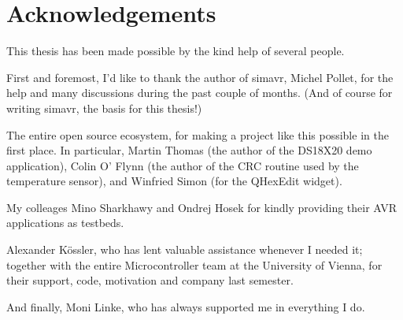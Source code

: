 \chapter{Acknowledgements} \label{chapter:acknowledgements}

This thesis has been made possible by the kind help of several people.

First and foremost, I'd like to thank the author of simavr, Michel Pollet, for
the help and many discussions during the past couple of months. (And of course
for writing simavr, the basis for this thesis!)

The entire open source ecosystem, for making a project like this possible in the
first place. In particular, Martin Thomas (the author of the DS18X20 demo
application), Colin O' Flynn (the author of the CRC routine used by the
temperature sensor), and Winfried Simon (for the QHexEdit widget).

My colleages Mino Sharkhawy and Ondrej Hosek for kindly providing their AVR
applications as testbeds.

Alexander K\"ossler, who has lent valuable assistance whenever I needed it;
together with the entire Microcontroller team at the University of Vienna, for
their support, code, motivation and company last semester.

And finally, Moni Linke, who has always supported me in everything I do.